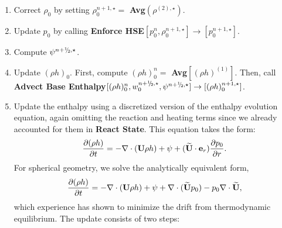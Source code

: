 \begin{description}
\begin{enumerate}
\item Correct $\rho_0$ by setting $\rho_0^{n+1,\star} =$ {\bf Avg}$(\rho^{(2),\star})$.

\item Update $p_0$ by calling 
{\bf Enforce HSE}$[p_0^n,\rho_0^{n+1,\star}] \rightarrow [p_0^{n+1,\star}]$.

\item Compute $\psi^{\nph,\star}$.

\item Update $(\rho h)_0$.  First, compute $(\rho h)_0^n = $ {\bf Avg}$[(\rho h)^{(1)}]$.
Then, call\\
{\bf Advect Base Enthalpy}$[(\rho h)_0^{n}, w_0^{\nph,\star}, \psi^{\nph,\star}] \rightarrow [(\rho h)_0^{n+1,\star}]$.

\item Update the enthalpy using a discretized version of the enthalpy
evolution equation, again omitting the reaction and heating terms
since we already accounted for
them in {\bf React State}.  This equation takes the form:
\begin{equation}
\frac{\partial (\rho h)}{\partial t}  = - \nabla \cdot ({\bf U} \rho h) + \psi + (\widetilde{{\bf U}} \cdot {\bf e}_r) \frac{\partial p_0}{\partial r}.
\end{equation}
For spherical geometry, we solve the
analytically equivalent form,
\begin{equation}
\frac{\partial (\rho h)}{\partial t}  = - \nabla \cdot ({\bf U} \rho h) + \psi + \nabla \cdot (\widetilde{{\bf U}} p_0) - p_0 \nabla \cdot \widetilde{{\bf U}},
\end{equation}
which experience has shown to minimize the drift from thermodynamic
equilibrium.  The update consists of two steps:


\end{enumerate}
\end{description}
